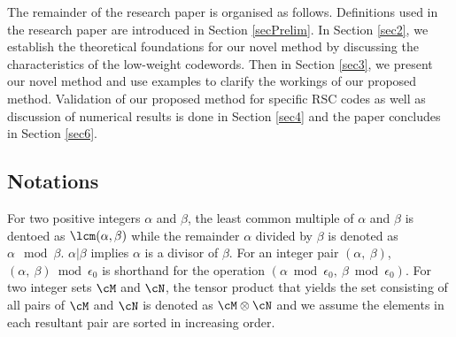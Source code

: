 The remainder of the research paper is organised as follows. Definitions used in the research paper are introduced in Section \ref{secPrelim}. In Section \ref{sec2}, we establish the theoretical foundations for our novel method by discussing the characteristics of the low-weight codewords. Then in Section \ref{sec3}, we present our novel method and use examples to clarify the workings of our proposed method. Validation of our proposed method for specific RSC codes as well as discussion of numerical results is done in Section \ref{sec4} and the paper concludes in Section \ref{sec6}.

\subsection{Notations}

For two positive integers $\alpha$ and $\beta$, the least common multiple of $\alpha$ and $\beta$ is dentoed as $\lcm(\alpha,\beta)$ while the remainder $\alpha$ divided by $\beta$ is denoted as $\alpha \mod \beta$. $\alpha | \beta$ implies $\alpha$ is a divisor of $\beta$. For an integer pair $(\alpha,~\beta)$, $(\alpha,~\beta) \bmod \epsilon_0$ is shorthand for the operation $(\alpha \bmod \epsilon_0,~\beta \bmod \epsilon_0)$. For two integer sets $\cM$ and $\cN$, the tensor product that yields the set consisting of all pairs of $\cM$ and $\cN$ is denoted as $\cM \otimes \cN$ and we assume the elements in each resultant pair are sorted in increasing order. 



